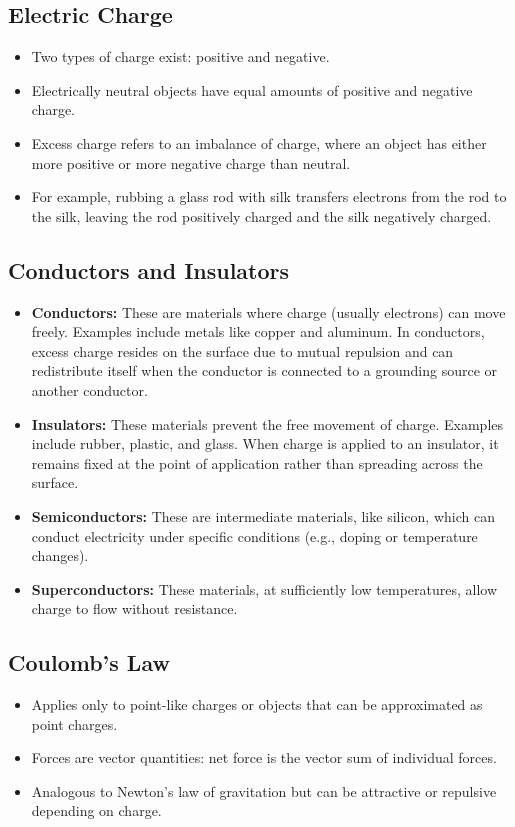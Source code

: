\documentclass{article}
\begin{document}
\subsection*{Electric Charge}
\begin{itemize}
    \item Two types of charge exist: positive and negative.
    \item Electrically neutral objects have equal amounts of positive and negative charge.
    \item Excess charge refers to an imbalance of charge, where an object has either more positive or more negative charge than neutral.
    \item For example, rubbing a glass rod with silk transfers electrons from the rod to the silk, leaving the rod positively charged and the silk negatively charged.
\end{itemize}

\subsection*{Conductors and Insulators}
\begin{itemize}
    \item \textbf{Conductors:} These are materials where charge (usually electrons) can move freely. Examples include metals like copper and aluminum. In conductors, excess charge resides on the surface due to mutual repulsion and can redistribute itself when the conductor is connected to a grounding source or another conductor.
    \item \textbf{Insulators:} These materials prevent the free movement of charge. Examples include rubber, plastic, and glass. When charge is applied to an insulator, it remains fixed at the point of application rather than spreading across the surface.
    \item \textbf{Semiconductors:} These are intermediate materials, like silicon, which can conduct electricity under specific conditions (e.g., doping or temperature changes).
    \item \textbf{Superconductors:} These materials, at sufficiently low temperatures, allow charge to flow without resistance.
\end{itemize}

\subsection*{Coulomb's Law}
\begin{itemize}
    \item Applies only to point-like charges or objects that can be approximated as point charges.
    \item Forces are vector quantities: net force is the vector sum of individual forces.
    \item Analogous to Newton's law of gravitation but can be attractive or repulsive depending on charge.
\end{itemize}
\end{document}
